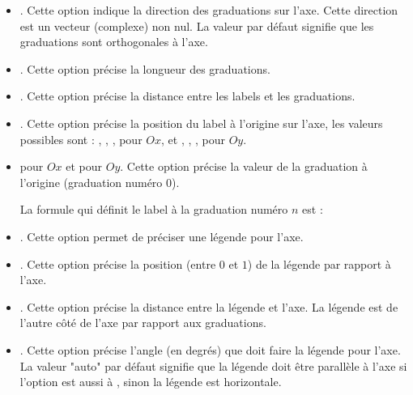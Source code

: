 \begin{itemize}
\begin{itemize}
            \item {}. Cette option indique la direction des graduations sur l'axe. Cette direction est un vecteur (complexe) non nul. La valeur par défaut  signifie que les graduations sont orthogonales à l'axe.
            
            \item {}. Cette option précise la longueur des graduations.
            
            \item {}. Cette option précise la distance entre les labels et les graduations.
            
            \item {}. Cette option précise la position du label à l'origine sur l'axe, les valeurs possibles sont : , , ,  pour $Ox$, et , , ,  pour $Oy$.
            
            \item {} pour $Ox$ et  pour $Oy$. Cette option précise la valeur de la graduation à l'origine (graduation numéro $0$). 
            
            La formule qui définit le label à la graduation numéro $n$ est : 

            \item {}. Cette option permet de préciser une légende pour l'axe.
            
            \item {}. Cette option précise la position (entre $0$ et $1$) de la légende par rapport à l'axe.
            
            \item {}. Cette option précise la distance entre la légende et l'axe. La légende est de l'autre côté de l'axe par rapport aux graduations.
            
            \item {}. Cette option précise l'angle (en degrés) que doit faire la légende pour l'axe. La valeur "auto" par défaut signifie que la légende doit être parallèle à l'axe si l'option  est aussi à , sinon la légende est horizontale.
            

\end{itemize}
\end{itemize}
